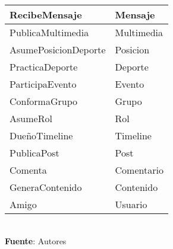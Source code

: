 \begin{table}[!htb]
\begin{center}
{\begin{tabular}{|l|l|l|l|}
\multicolumn{2}{|l|}{RecibeMensaje} & \multicolumn{2}{l|}{Mensaje} \\ \hline
\multicolumn{2}{|l|}{PublicaMultimedia} & \multicolumn{2}{l|}{Multimedia} \\ \hline
\multicolumn{2}{|l|}{AsumePosicionDeporte} & \multicolumn{2}{l|}{Posicion} \\ \hline
\multicolumn{2}{|l|}{PracticaDeporte} & \multicolumn{2}{l|}{Deporte} \\ \hline
\multicolumn{2}{|l|}{ParticipaEvento} & \multicolumn{2}{l|}{Evento} \\ \hline
\multicolumn{2}{|l|}{ConformaGrupo} & \multicolumn{2}{l|}{Grupo} \\ \hline
\multicolumn{2}{|l|}{AsumeRol} & \multicolumn{2}{l|}{Rol} \\ \hline
\multicolumn{2}{|l|}{DueñoTimeline} & \multicolumn{2}{l|}{Timeline} \\ \hline
\multicolumn{2}{|l|}{PublicaPost} & \multicolumn{2}{l|}{Post} \\ \hline
\multicolumn{2}{|l|}{Comenta} & \multicolumn{2}{l|}{Comentario} \\ \hline
\multicolumn{2}{|l|}{GeneraContenido} & \multicolumn{2}{l|}{Contenido} \\ \hline
\multicolumn{2}{|l|}{Amigo} & \multicolumn{2}{l|}{Usuario} \\ \hline
\end{tabular}
		} \\
		\textbf{Fuente}: Autores
		\end{center}
	\end{table}